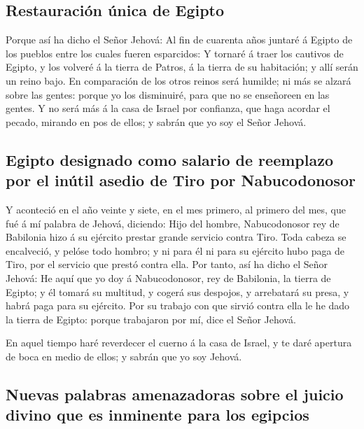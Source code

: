 \hypertarget{restauraciuxf3n-uxfanica-de-egipto}{%
\subsection{Restauración única de
Egipto}\label{restauraciuxf3n-uxfanica-de-egipto}}

 Porque así ha dicho el Señor Jehová: Al fin de cuarenta
años juntaré á Egipto de los pueblos entre los cuales fueren esparcidos:
 Y tornaré á traer los cautivos de Egipto, y los volveré
á la tierra de Patros, á la tierra de su habitación; y allí serán un
reino bajo.  En comparación de los otros reinos será
humilde; ni más se alzará sobre las gentes: porque yo los disminuiré,
para que no se enseñoreen en las gentes.  Y no será más á
la casa de Israel por confianza, que haga acordar el pecado, mirando en
pos de ellos; y sabrán que yo soy el Señor Jehová.

\hypertarget{egipto-designado-como-salario-de-reemplazo-por-el-inuxfatil-asedio-de-tiro-por-nabucodonosor}{%
\subsection{Egipto designado como salario de reemplazo por el inútil
asedio de Tiro por
Nabucodonosor}\label{egipto-designado-como-salario-de-reemplazo-por-el-inuxfatil-asedio-de-tiro-por-nabucodonosor}}

 Y aconteció en el año veinte y siete, en el mes primero,
al primero del mes, que fué á mí palabra de Jehová, diciendo:
 Hijo del hombre, Nabucodonosor rey de Babilonia hizo á
su ejército prestar grande servicio contra Tiro. Toda cabeza se
encalveció, y pelóse todo hombro; y ni para él ni para su ejército hubo
paga de Tiro, por el servicio que prestó contra ella. 
Por tanto, así ha dicho el Señor Jehová: He aquí que yo doy á
Nabucodonosor, rey de Babilonia, la tierra de Egipto; y él tomará su
multitud, y cogerá sus despojos, y arrebatará su presa, y habrá paga
para su ejército.  Por su trabajo con que sirvió contra
ella le he dado la tierra de Egipto: porque trabajaron por mí, dice el
Señor Jehová.

 En aquel tiempo haré reverdecer el cuerno á la casa de
Israel, y te daré apertura de boca en medio de ellos; y sabrán que yo
soy Jehová.

\hypertarget{nuevas-palabras-amenazadoras-sobre-el-juicio-divino-que-es-inminente-para-los-egipcios}{%
\subsection{Nuevas palabras amenazadoras sobre el juicio divino que es
inminente para los
egipcios}\label{nuevas-palabras-amenazadoras-sobre-el-juicio-divino-que-es-inminente-para-los-egipcios}}

